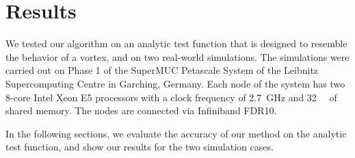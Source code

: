 
%
\section{Results} %
\label{sec:fst_results}
%
We tested our algorithm on an analytic test function that is designed to
resemble the behavior of a vortex, and on two real-world simulations.
%
The simulations were carried out on Phase 1 of the SuperMUC Petascale System of
the Leibnitz Supercomputing Centre in Garching, Germany.
%
Each node of the system has two 8-core Intel Xeon E5 processors with a clock
frequency of \SI{2.7}{\giga\hertz} and \SI{32}{\giga\byte} of shared memory.
%
The nodes are connected via Infiniband FDR10.
%

%
In the following sections, we evaluate the accuracy of our method on the
analytic test function, and show our results for the two simulation cases.
%

%
